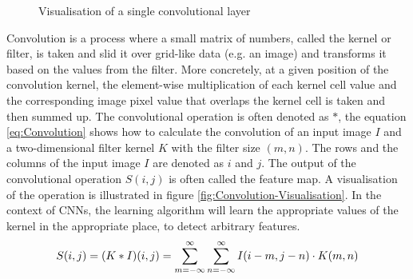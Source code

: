 \begin{figure}[htbp]
    \captionsetup{format=plain}
    \centering
    \caption{Visualisation of a single convolutional layer}
    \label{fig:Convolution-Layer-Visualisation}
\end{figure}
\noindent
Convolution is a process where a small matrix of numbers, called the kernel or filter, is taken and slid it over grid-like data (e.g. an image) and transforms it based on the values from the filter. More concretely, at a given position of the convolution kernel, the element-wise multiplication of each kernel cell value and the corresponding image pixel value that overlaps the kernel cell is taken and then summed up. The convolutional operation is often denoted as $\ast$, the equation \ref{eq:Convolution} shows how to calculate the convolution of an input image $I$ and a two-dimensional filter kernel $K$ with the filter size $(m, n)$. The rows and the columns of the input image $I$ are denoted as $i$ and $j$. The output of the convolutional operation $S(i,j)$ is often called the feature map. A visualisation of the operation is illustrated in figure \ref{fig:Convolution-Visualisation}. In the context of \glspl{CNN}, the learning algorithm will learn the appropriate values of the kernel in the appropriate place, to detect arbitrary features.
\begin{equation}
    \centering
    S(i,j) = (K \ast I)(i,j) = \sum_{m=-\infty}^\infty \sum_{n=-\infty}^\infty I(i-m, j-n) \cdot K(m,n)
    \label{eq:Convolution}
\end{equation}
